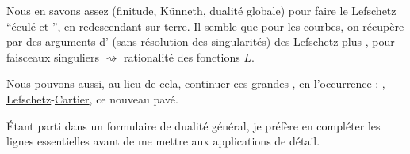 Nous en savons assez (finitude, Künneth, dualité
globale) pour faire le Lefschetz ``éculé et '',
en redescendant sur terre. Il semble que pour les
courbes, on récupère par des arguments d'
(sans résolution des singularités) des Lefschetz plus
, pour faisceaux singuliers $\rightsquigarrow$
rationalité des fonctions $L$.

Nous pouvons aussi, au lieu de cela,
continuer ces grandes , en l'occurrence :
, 
\uline{Lefschetz}-\uline{Cartier}, 
 ce nouveau pavé.

Étant parti dans un formulaire de dualité
général, je préfère en compléter les lignes essentielles
avant de  me mettre aux applications de
détail.
